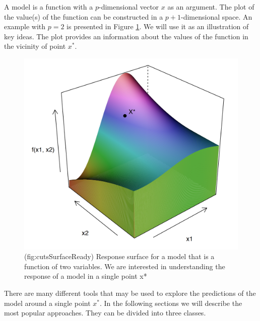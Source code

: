 \documentclass[12pt,]{krantz}
\begin{document}
A model is a function with a \(p\)-dimensional vector \(x\) as an argument. The plot of the value(s) of the function can be constructed in a \(p+1\)-dimensional space. An example with \(p=2\) is presented in Figure \ref{fig:cutsSurfaceReady}. We will use it as an illustration of key ideas. The plot provides an information about the values of the function in the vicinity of point \(x^*\).

\begin{figure}

{\centering \includegraphics[width=0.6\linewidth]{figure/cuts_surface_ready_punkt} 

}

\caption{(fig:cutsSurfaceReady) Response surface for a model that is a function of two variables. We are interested in understanding the response of a model in a single point x*}\label{fig:cutsSurfaceReady}
\end{figure}

There are many different tools that may be used to explore the predictions of the model around a single point \(x^*\). In the following sections we will describe the most popular approaches. They can be divided into three classes.
\end{document}
